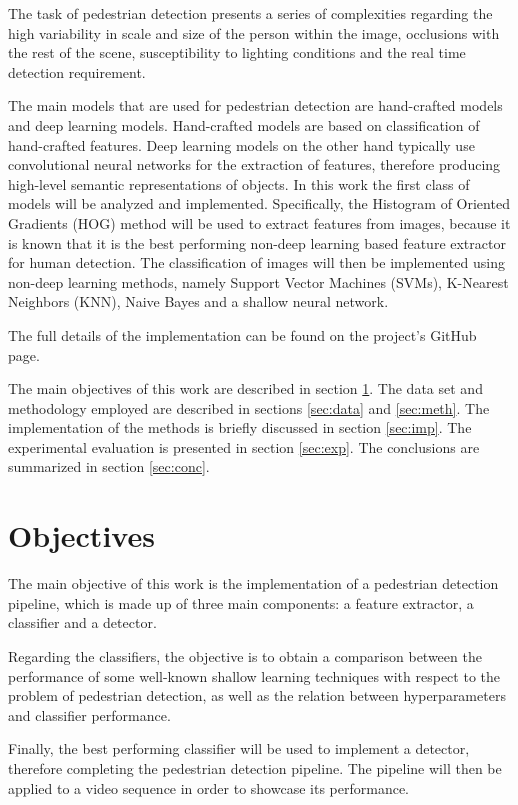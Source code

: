 \documentclass[journal,twocolumn]{IEEEtran}
\begin{document}
The task of pedestrian detection presents a series of complexities regarding the high variability in scale and size of the
person within the image, occlusions with the rest of the scene,
susceptibility to lighting conditions and the real time detection
requirement.

The main models that are used for pedestrian detection are
hand-crafted models and deep learning models. Hand-crafted
models are based on classification of hand-crafted features. Deep learning models on the other hand typically use
convolutional neural networks for the extraction of features,
therefore producing high-level semantic representations of
objects.
In this work the first class of models will be analyzed
and implemented. Specifically, the Histogram of Oriented
Gradients (HOG) method will be used to extract features from
images, because it is known\cite{2} that it is the best performing non-deep learning based feature extractor for human detection. The classification of images will then be implemented
using non-deep learning methods, namely Support Vector
Machines (SVMs), K-Nearest Neighbors (KNN), Naive Bayes and a shallow neural network.

The full details of the implementation can be found on the project's GitHub page\cite{4}.

The main objectives of this work are described in section
\ref{sec:obj}. The data set and methodology employed are described in
sections \ref{sec:data} and \ref{sec:meth}. The implementation of the methods is briefly discussed in section \ref{sec:imp}. The experimental evaluation is presented
in section \ref{sec:exp}. The conclusions are summarized in section \ref{sec:conc}.

\section{Objectives}
\label{sec:obj}
The main objective of this work is the implementation of
a pedestrian detection pipeline, which is made up
of three main components: a feature extractor, a classifier and a
detector.

Regarding the classifiers, the objective is to obtain a comparison between the performance of some well-known shallow learning techniques with respect to the problem of pedestrian detection, as well as the relation between hyperparameters and classifier performance.

Finally, the best performing classifier will be used to implement a detector, therefore completing the pedestrian detection pipeline. The pipeline will then be applied to a video sequence in order to showcase its performance.
\end{document}
